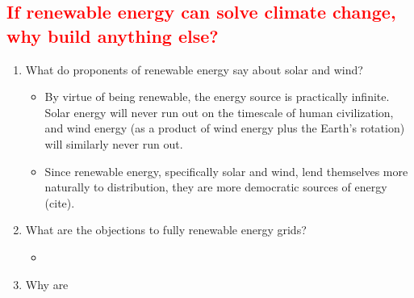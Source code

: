 \subsection{\textcolor{red}{If renewable energy can solve climate change, why build anything else?}}

\begin{enumerate}
    \item What do proponents of renewable energy say about solar and wind?
    \begin{itemize}
        \item By virtue of being renewable, the energy source is practically infinite. Solar energy will 
        never run out on the timescale of human civilization, and wind energy (as a product of wind energy plus
        the Earth's rotation) will similarly never run out.
        \item Since renewable energy, specifically solar and wind, lend themselves more naturally to distribution,
        they are more democratic sources of energy (cite).
    \end{itemize}
    \item What are the objections to fully renewable energy grids?
    \begin{itemize}
        \item 
    \end{itemize}
    \item Why are 
\end{enumerate}